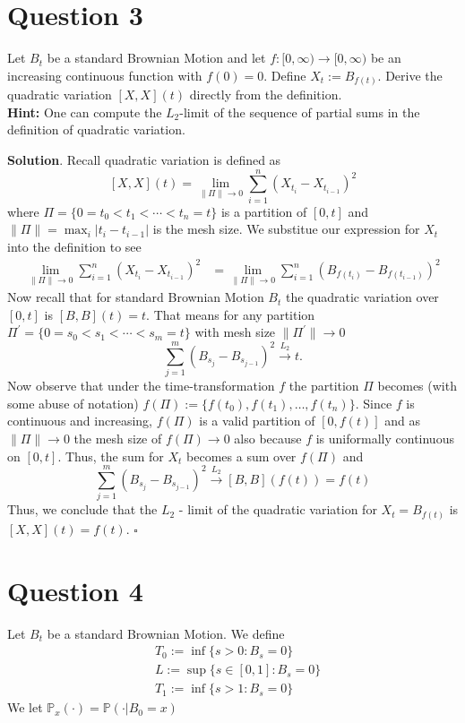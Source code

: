 \documentclass{article}
\begin{document}
\section{Question 3}
\begin{tcolorbox}
[colframe=black,colback=gray!5,boxrule=0.5pt]
Let $B_t$ be a standard Brownian Motion and let $f : [0,\infty) \to [0,\infty)$ be an increasing continuous function with $f(0)=0.$ Define $X_t := B_{f(t)}$. Derive the quadratic variation $[X,X](t)$ directly from the definition. \\
\textbf{Hint:} One can compute the $L_2$-limit of the sequence of partial sums in the definition of quadratic variation.
\end{tcolorbox}
\textbf{Solution}. Recall quadratic variation is defined as 
$$[X,X](t) = \lim_{\|\Pi\|\to0}\sum_{i=1}^{n}(X_{t_i} - X_{t_{i-1}})^2$$
where $\Pi = \{0=t_0 < t_1<\dotsm < t_n=t\}$ is a partition of $[0,t]$ and $\|\Pi\| = \max_i |t_i - t_{i-1}|$ is the mesh size. We substitue our expression for $X_t$ into the definition to see
\begin{align*}
    \lim_{\|\Pi\|\to0}\sum_{i=1}^{n}(X_{t_i} - X_{t_{i-1}})^2 &= \lim_{\|\Pi\|\to0}\sum_{i=1}^{n}(B_{f(t_i)} - B_{f(t_{i-1})})^2
\end{align*}
Now recall that for standard Brownian Motion $B_t$ the quadratic variation over $[0,t]$ is $[B,B](t) = t$. That means for any partition $\Pi^\prime = \{0 = s_0 < s_1<\dotsm < s_m = t\}$ with mesh size $\|\Pi^\prime\|\to0$ 
$$\sum_{j=1}^{m}(B_{s_j} - B_{s_{j-1}})^2 \stackrel{L_2}{\rightarrow} t.$$
Now observe that under the time-transformation $f$ the partition $\Pi$ becomes (with some abuse of notation) $f(\Pi) := \{f(t_0),f(t_1),\dots,f(t_n)\}$. Since $f$ is continuous and increasing, $f(\Pi)$ is a valid partition of $[0, f(t)]$ and as $\|\Pi\|\to0$ the mesh size of $f(\Pi)\to0$ also because $f$ is uniformally continuous on $[0,t]$. Thus, the sum for $X_t$ becomes a sum over $f(\Pi)$ and 
$$\sum_{j=1}^{m}(B_{s_j} - B_{s_{j-1}})^2 \stackrel{L_2}{\rightarrow} [B,B](f(t)) = f(t)$$
Thus, we conclude that the $L_2$ - limit of the quadratic variation for $X_t = B_{f(t)}$ is $[X,X](t) = f(t)$. $\square$

\newpage
\section{Question 4}

\begin{tcolorbox}
[colframe=black,colback=gray!5,boxrule=0.5pt]
Let $B_t$ be a standard Brownian Motion. We define
\begin{align*}
    & T_0 := \inf\{s>0: B_s =0\} \\
    & L := \sup\{s\in[0,1]: B_s=0\}  \\
    & T_1 := \inf \{s>1: B_s=0\}
\end{align*}
We let $\mathbb{P}_x(\cdot) = \mathbb{P}(\cdot|B_0=x)$
\end{tcolorbox}
\end{document}
